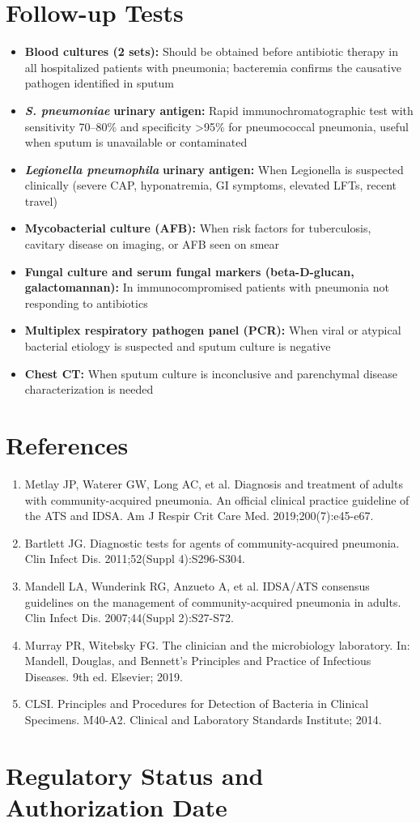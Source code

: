 \section*{Follow-up Tests}
\begin{itemize}
  \item \textbf{Blood cultures (2 sets):} Should be obtained before antibiotic therapy in all hospitalized patients with pneumonia; bacteremia confirms the causative pathogen identified in sputum
  \item \textit{\textbf{S. pneumoniae}} \textbf{urinary antigen:} Rapid immunochromatographic test with sensitivity 70--80\% and specificity >95\% for pneumococcal pneumonia, useful when sputum is unavailable or contaminated
  \item \textit{\textbf{Legionella pneumophila}} \textbf{urinary antigen:} When Legionella is suspected clinically (severe CAP, hyponatremia, GI symptoms, elevated LFTs, recent travel)
  \item \textbf{Mycobacterial culture (AFB):} When risk factors for tuberculosis, cavitary disease on imaging, or AFB seen on smear
  \item \textbf{Fungal culture and serum fungal markers (beta-D-glucan, galactomannan):} In immunocompromised patients with pneumonia not responding to antibiotics
  \item \textbf{Multiplex respiratory pathogen panel (PCR):} When viral or atypical bacterial etiology is suspected and sputum culture is negative
  \item \textbf{Chest CT:} When sputum culture is inconclusive and parenchymal disease characterization is needed
\end{itemize}

\section*{References}
\begin{enumerate}
  \item Metlay JP, Waterer GW, Long AC, et al. Diagnosis and treatment of adults with community-acquired pneumonia. An official clinical practice guideline of the ATS and IDSA. Am J Respir Crit Care Med. 2019;200(7):e45-e67.
  \item Bartlett JG. Diagnostic tests for agents of community-acquired pneumonia. Clin Infect Dis. 2011;52(Suppl 4):S296-S304.
  \item Mandell LA, Wunderink RG, Anzueto A, et al. IDSA/ATS consensus guidelines on the management of community-acquired pneumonia in adults. Clin Infect Dis. 2007;44(Suppl 2):S27-S72.
  \item Murray PR, Witebsky FG. The clinician and the microbiology laboratory. In: Mandell, Douglas, and Bennett's Principles and Practice of Infectious Diseases. 9th ed. Elsevier; 2019.
  \item CLSI. Principles and Procedures for Detection of Bacteria in Clinical Specimens. M40-A2. Clinical and Laboratory Standards Institute; 2014.
\end{enumerate}

\clearpage
\section*{Regulatory Status and Authorization Date}

\clearpage
